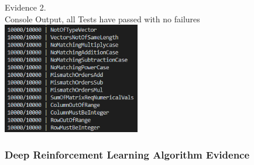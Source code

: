 \begin{center}
    {\large Evidence 2.\rn } \\ 
    \vspace{0.3cm}
    Console Output, all Tests have passed with no failures \\
    \includegraphics[width=6cm]{Images/Testing/T2.23.1.PNG} \\
    \vspace{1cm}
\end{center}

\subsubsection{Deep Reinforcement Learning Algorithm Evidence}

